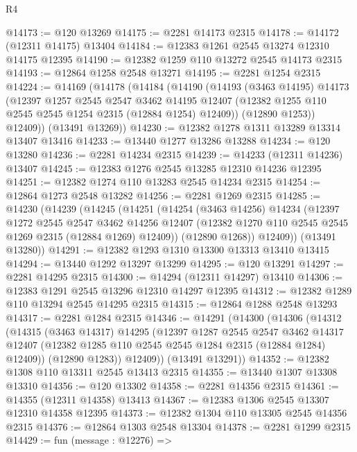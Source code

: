 \begin{lexlean}{R4}
\begin{coremodule}
@14173 := @120 @13269
@14175 := @2281 @14173 @2315
@14178 := @14172 (@12311 @14175) @13404
@14184 := @12383 @1261 @2545 @13274 @12310 @14175 @12395
@14190 := @12382 @1259 @110 @13272 @2545 @14173 @2315
@14193 := @12864 @1258 @2548 @13271
@14195 := @2281 @1254 @2315
@14224 := @14169
    (@14178
      (@14184
        (@14190
          (@14193
            (@3463 @14195)
            @14173
            (@12397
              @1257
              @2545
              @2547
              @3462
              @14195
              @12407
              (@12382 @1255 @110 @2545 @2545 @1254 @2315 (@12884 @1254) @12409))
            (@12890 @1253))
          @12409))
      (@13491 @13269))
@14230 := @12382 @1278 @1311 @13289 @13314 @13407 @13416
@14233 := @13440 @1277 @13286 @13288
@14234 := @120 @13280
@14236 := @2281 @14234 @2315
@14239 := @14233 (@12311 @14236) @13407
@14245 := @12383 @1276 @2545 @13285 @12310 @14236 @12395
@14251 := @12382 @1274 @110 @13283 @2545 @14234 @2315
@14254 := @12864 @1273 @2548 @13282
@14256 := @2281 @1269 @2315
@14285 := @14230
    (@14239
      (@14245
        (@14251
          (@14254
            (@3463 @14256)
            @14234
            (@12397
              @1272
              @2545
              @2547
              @3462
              @14256
              @12407
              (@12382 @1270 @110 @2545 @2545 @1269 @2315 (@12884 @1269) @12409))
            (@12890 @1268))
          @12409))
      (@13491 @13280))
@14291 := @12382 @1293 @1310 @13300 @13313 @13410 @13415
@14294 := @13440 @1292 @13297 @13299
@14295 := @120 @13291
@14297 := @2281 @14295 @2315
@14300 := @14294 (@12311 @14297) @13410
@14306 := @12383 @1291 @2545 @13296 @12310 @14297 @12395
@14312 := @12382 @1289 @110 @13294 @2545 @14295 @2315
@14315 := @12864 @1288 @2548 @13293
@14317 := @2281 @1284 @2315
@14346 := @14291
    (@14300
      (@14306
        (@14312
          (@14315
            (@3463 @14317)
            @14295
            (@12397
              @1287
              @2545
              @2547
              @3462
              @14317
              @12407
              (@12382 @1285 @110 @2545 @2545 @1284 @2315 (@12884 @1284) @12409))
            (@12890 @1283))
          @12409))
      (@13491 @13291))
@14352 := @12382 @1308 @110 @13311 @2545 @13413 @2315
@14355 := @13440 @1307 @13308 @13310
@14356 := @120 @13302
@14358 := @2281 @14356 @2315
@14361 := @14355 (@12311 @14358) @13413
@14367 := @12383 @1306 @2545 @13307 @12310 @14358 @12395
@14373 := @12382 @1304 @110 @13305 @2545 @14356 @2315
@14376 := @12864 @1303 @2548 @13304
@14378 := @2281 @1299 @2315
@14429 := fun (message : @12276) =>

\end{coremodule}
\end{lexlean}
